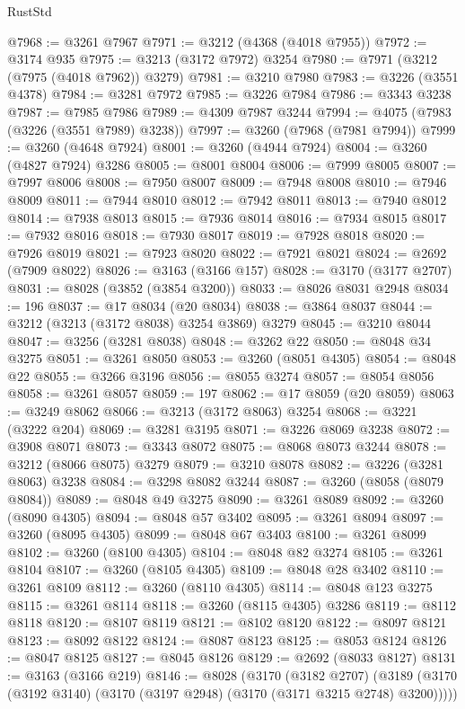 \begin{lexlean}{RustStd}
\begin{coremodule}
{\begin{coremodule}
{{{{{{{{{{{{{{{{{{{{{{{{{{@7968 := @3261 @7967
@7971 := @3212 (@4368 (@4018 @7955))
@7972 := @3174 @935
@7975 := @3213 (@3172 @7972) @3254
@7980 := @7971 (@3212 (@7975 (@4018 @7962)) @3279)
@7981 := @3210 @7980
@7983 := @3226 (@3551 @4378)
@7984 := @3281 @7972
@7985 := @3226 @7984
@7986 := @3343 @3238
@7987 := @7985 @7986
@7989 := @4309 @7987 @3244
@7994 := @4075 (@7983 (@3226 (@3551 @7989) @3238))
@7997 := @3260 (@7968 (@7981 @7994))
@7999 := @3260 (@4648 @7924)
@8001 := @3260 (@4944 @7924)
@8004 := @3260 (@4827 @7924) @3286
@8005 := @8001 @8004
@8006 := @7999 @8005
@8007 := @7997 @8006
@8008 := @7950 @8007
@8009 := @7948 @8008
@8010 := @7946 @8009
@8011 := @7944 @8010
@8012 := @7942 @8011
@8013 := @7940 @8012
@8014 := @7938 @8013
@8015 := @7936 @8014
@8016 := @7934 @8015
@8017 := @7932 @8016
@8018 := @7930 @8017
@8019 := @7928 @8018
@8020 := @7926 @8019
@8021 := @7923 @8020
@8022 := @7921 @8021
@8024 := @2692 (@7909 @8022)
@8026 := @3163 (@3166 @157)
@8028 := @3170 (@3177 @2707)
@8031 := @8028 (@3852 (@3854 @3200))
@8033 := @8026 @8031 @2948
@8034 := 196
@8037 := @17 @8034 (@20 @8034)
@8038 := @3864 @8037
@8044 := @3212 (@3213 (@3172 @8038) @3254 @3869) @3279
@8045 := @3210 @8044
@8047 := @3256 (@3281 @8038)
@8048 := @3262 @22
@8050 := @8048 @34 @3275
@8051 := @3261 @8050
@8053 := @3260 (@8051 @4305)
@8054 := @8048 @22
@8055 := @3266 @3196
@8056 := @8055 @3274
@8057 := @8054 @8056
@8058 := @3261 @8057
@8059 := 197
@8062 := @17 @8059 (@20 @8059)
@8063 := @3249 @8062
@8066 := @3213 (@3172 @8063) @3254
@8068 := @3221 (@3222 @204)
@8069 := @3281 @3195
@8071 := @3226 @8069 @3238
@8072 := @3908 @8071
@8073 := @3343 @8072
@8075 := @8068 @8073 @3244
@8078 := @3212 (@8066 @8075) @3279
@8079 := @3210 @8078
@8082 := @3226 (@3281 @8063) @3238
@8084 := @3298 @8082 @3244
@8087 := @3260 (@8058 (@8079 @8084))
@8089 := @8048 @49 @3275
@8090 := @3261 @8089
@8092 := @3260 (@8090 @4305)
@8094 := @8048 @57 @3402
@8095 := @3261 @8094
@8097 := @3260 (@8095 @4305)
@8099 := @8048 @67 @3403
@8100 := @3261 @8099
@8102 := @3260 (@8100 @4305)
@8104 := @8048 @82 @3274
@8105 := @3261 @8104
@8107 := @3260 (@8105 @4305)
@8109 := @8048 @28 @3402
@8110 := @3261 @8109
@8112 := @3260 (@8110 @4305)
@8114 := @8048 @123 @3275
@8115 := @3261 @8114
@8118 := @3260 (@8115 @4305) @3286
@8119 := @8112 @8118
@8120 := @8107 @8119
@8121 := @8102 @8120
@8122 := @8097 @8121
@8123 := @8092 @8122
@8124 := @8087 @8123
@8125 := @8053 @8124
@8126 := @8047 @8125
@8127 := @8045 @8126
@8129 := @2692 (@8033 @8127)
@8131 := @3163 (@3166 @219)
@8146 := @8028
    (@3170
      (@3182 @2707)
      (@3189 (@3170 (@3192 @3140) (@3170 (@3197 @2948) (@3170 (@3171 @3215 @2748) @3200)))))
}}}}}}}}}}}}}}}}}}}}}}}}}}
\end{coremodule}}
\end{coremodule}
\end{lexlean}
